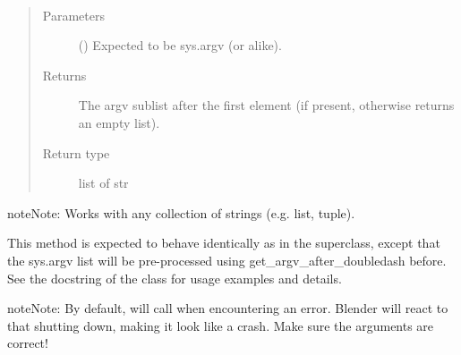 \documentclass[letterpaper,10pt,english,openany,oneside]{sphinxmanual}
\begin{document}
\begin{fulllineitems}
\begin{fulllineitems}
\label{\detokenize{mpiea_mmr:mpiea_mmr.blender_utils.ArgumentParserForBlender.get_argv_after_doubledash}}~\begin{quote}\begin{description}
\item[{Parameters}] \leavevmode
{} () \textendash{} Expected to be sys.argv (or alike).

\item[{Returns}] \leavevmode
The argv sublist after the first  element (if
present, otherwise returns an empty list).

\item[{Return type}] \leavevmode
list of str

\end{description}\end{quote}

\begin{sphinxadmonition}{note}{Note:}
Works with any  collection of strings (e.g. list, tuple).
\end{sphinxadmonition}

\end{fulllineitems}


\begin{fulllineitems}
\label{\detokenize{mpiea_mmr:mpiea_mmr.blender_utils.ArgumentParserForBlender.parse_args}}
This method is expected to behave identically as in the superclass,
except that the sys.argv list will be pre-processed using
get\_argv\_after\_doubledash before. See the docstring of the class for
usage examples and details.

\begin{sphinxadmonition}{note}{Note:}
By default,  will call  when
encountering an error. Blender will react to that shutting down,
making it look like a crash. Make sure the arguments are correct!
\end{sphinxadmonition}

\end{fulllineitems}


\end{fulllineitems}
\end{document}
